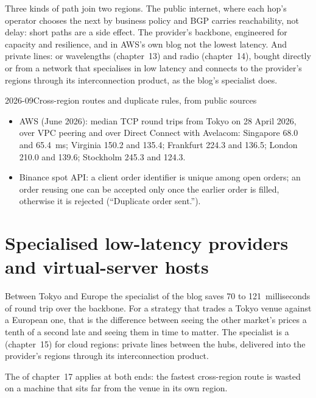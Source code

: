 Three kinds of path join two regions. The public internet, where each hop's operator chooses the next by business policy and BGP carries
reachability, not delay: short paths are a side effect. The provider's backbone, engineered for capacity and resilience, and in AWS's own blog not
the lowest latency. And private lines:  or wavelengths (chapter~13) and radio (chapter~14), bought directly or from a network that
specialises in low latency and connects to the provider's regions through its interconnection product, as the blog's specialist does.

\begin{dated}{2026-09}{Cross-region routes and duplicate rules, from public sources}\label{dat:nw:cross-region-crypto-networks:routes}
\begin{itemize}
\item AWS (June 2026): median TCP round trips from Tokyo on 28 April 2026, over VPC peering and over Direct Connect with Avelacom: Singapore 68.0 and
  65.4~ms; Virginia 150.2 and 135.4; Frankfurt 224.3 and 136.5; London 210.0 and 139.6; Stockholm 245.3 and 124.3.
\item Binance spot API: a client order identifier is unique among open orders; an order reusing one can be accepted only once the earlier order is
  filled, otherwise it is rejected (``Duplicate order sent.'').
\end{itemize}
\end{dated}

\section{Specialised low-latency providers and virtual-server hosts}

Between Tokyo and Europe the specialist of the blog saves 70 to 121~milliseconds of round trip over the backbone. For a strategy that trades a
Tokyo venue against a European one, that is the difference between seeing the other market's prices a tenth of a second late and seeing them in
time to matter. The specialist is a  (chapter~15) for cloud regions: private lines between the hubs, delivered into the
provider's regions through its interconnection product.

The  of chapter~17 applies at both ends: the fastest cross-region route is wasted on a machine that sits far from the venue in
its own region.

